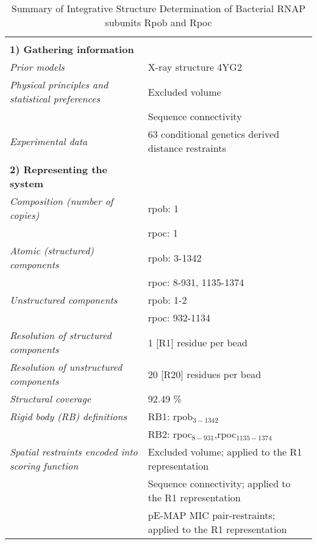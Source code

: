 \documentclass[8pt,a4paper]{article}
\begin{document}
\setcounter{table}{8}

\begin{longtable}{ p{} | p{} } 
\caption{Summary of Integrative Structure Determination of Bacterial RNAP subunits Rpob and Rpoc}
  
  &  \\
  \textbf{1) Gathering information} & \\
    \hline

            \textit{Prior models} & X-ray structure 4YG2\\
                \textit{Physical principles and statistical preferences} & Excluded volume\\
            & Sequence connectivity \\
                \textit{Experimental data} & 63 conditional genetics derived distance restraints\\
          
    &  \\
    \normalsize{\textbf{2) Representing the system}} & \\
    \hline
    
            \textit{Composition (number of copies)} & rpob: 1\\
            & rpoc: 1 \\
                \textit{Atomic (structured) components} & rpob: 3-1342\\
            & rpoc: 8-931, 1135-1374 \\
                \textit{Unstructured components} & rpob: 1-2\\
            & rpoc: 932-1134 \\
                \textit{Resolution of structured components} & 1 [R1] residue per bead\\
                \textit{Resolution of unstructured components} & 20 [R20] residues per bead\\
                \textit{Structural coverage} & 92.49 \%\\
                \textit{Rigid body (RB) definitions} & RB1: rpob$_{3-1342}$\\
            & RB2: rpoc$_{8-931}$,rpoc$_{1135-1374}$ \\
                \textit{Spatial restraints encoded into scoring function} & Excluded volume; applied to the R1 representation\\
            & Sequence connectivity; applied to the R1 representation \\
            & pE-MAP MIC pair-restraints; applied to the R1 representation \\
        


\end{longtable}
\end{document}
